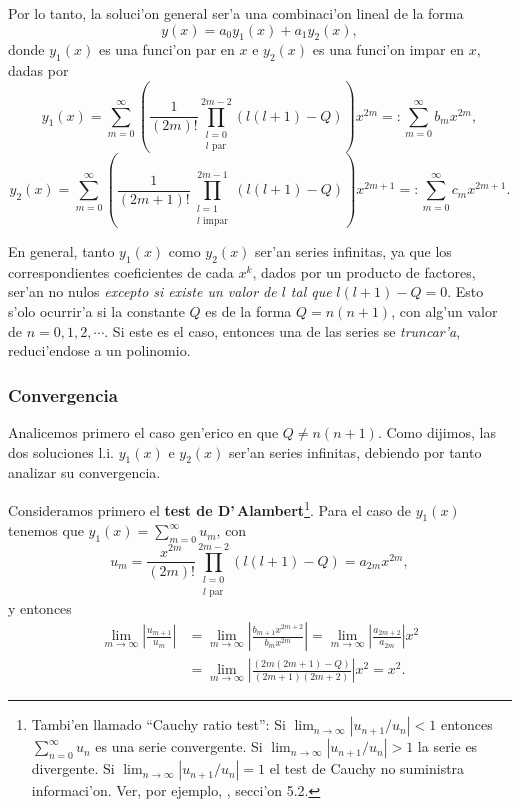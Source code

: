 Por lo tanto, la soluci'on general ser'a una combinaci'on lineal de la forma
\begin{equation}
y(x)=a_0y_1(x)+a_1y_2(x),
\end{equation}
donde $y_1(x)$ es una funci'on par en $x$ e $y_2(x)$ es una funci'on impar en $x$, dadas por
\begin{equation}
y_1(x) = \sum_{m= 0}^\infty \left(\frac{1}{(2m)!}
\prod_{\substack{l=0 \\ l \text{ par}}}^{2m-2}
\left( l (l+1) -Q \right) \right) x^{2m}=:\sum_{m= 0}^\infty b_m x^{2m}, \label{y1}
\end{equation}
\begin{equation}
y_2(x) = \sum_{m=0}^\infty\left( \frac{1}{(2m+1)!}
\prod_{\substack{l=1 \\ l \text{ impar}}}^{2m-1}
\left( l (l+1) - Q \right) \right) x^{2m+1}
=:\sum_{m= 0}^\infty c_m x^{2m+1}. \label{y2}
\end{equation}

En general, tanto $y_1(x)$ como $y_2(x)$ ser'an series infinitas, ya que los correspondientes coeficientes de cada $x^k$, dados por un producto de factores, ser'an no nulos \textit{excepto si existe un valor de $l$ tal que} $l(l+1)-Q=0$. Esto s'olo ocurrir'a si la constante $Q$ es de la forma $Q=n(n+1)$, con alg'un valor de $n=0,1,2,\cdots$. Si este es el caso, entonces una de las series se \textit{truncar'a}, reduci'endose a un polinomio.

\subsubsection{Convergencia}
Analicemos primero el caso gen'erico en que $Q\neq n(n+1)$. Como dijimos, las dos soluciones l.i. $y_1(x)$ e $y_2(x)$ ser'an series infinitas, debiendo por tanto analizar su convergencia.

Consideramos primero el \textbf{test de D'\,Alambert}\footnote{Tambi'en llamado ``Cauchy ratio test'': Si $\lim_{n\to\infty}\left|u_{n+1}/u_n\right|<1$ entonces $\sum_{n=0}^\infty u_n$ es una serie convergente. Si $\lim_{n\to\infty}\left|u_{n+1}/u_n\right|>1$ la serie es divergente. Si $\lim_{n\to\infty}\left|u_{n+1}/u_n\right|=1$ el test de Cauchy no suministra informaci'on. Ver, por ejemplo, \cite{Arfken}, secci'on 5.2.}. Para el caso de $y_1(x)$ tenemos que $y_1(x)=\sum_{m=0}^\infty u_m$, con 
\begin{equation}
u_m=\frac{x^{2m}}{(2m)!}
\prod_{\substack{l=0 \\ l \text{ par}}}^{2m-2}
\left( l (l+1) -Q \right)=a_{2m}x^{2m},
\end{equation}
y entonces
\begin{align}
\lim_{m\to\infty}\left|\frac{u_{m+1}}{u_m}\right| 
&=\lim_{m\to\infty}\left|\frac{b_{m+1}x^{2m+2}}{b_mx^{2m}}\right|
= \lim_{m\to\infty}\left|\frac{a_{2m+2}}{a_{2m}}\right| x^2 \\
&= \lim_{m\to\infty}\left|\frac{(2m(2m+1)-Q)}{(2m+1)(2m+2)}\right| x^2
= x^2.
\end{align}

